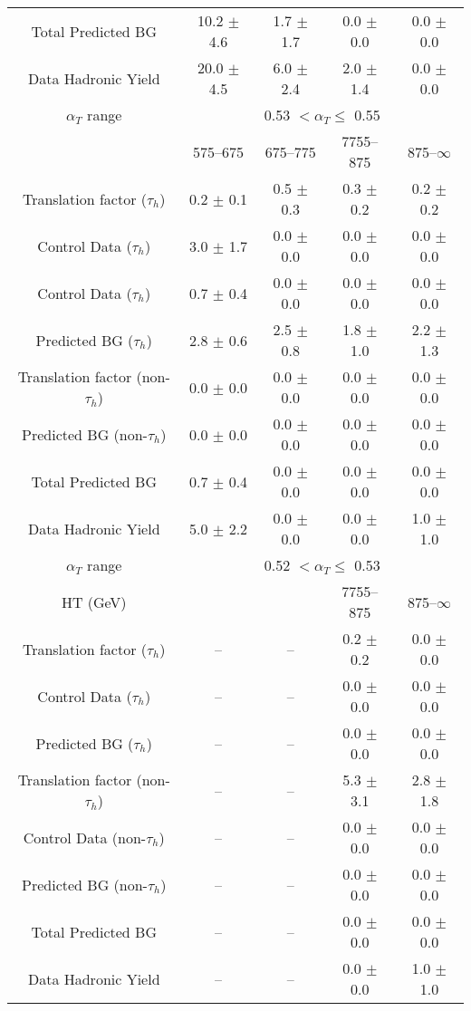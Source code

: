 \documentclass[a4paper,12pt]{article}
\begin{document}
\begin{table}[htl]
\begin{flushleft}
\begin{tabular}{ c|cccc }
Total Predicted BG & 10.2 $\pm$ 4.6  & 1.7 $\pm$ 1.7  & 0.0 $\pm$ 0.0  & 0.0 $\pm$ 0.0 \\ 
Data Hadronic Yield & 20.0 $\pm$ 4.5  & 6.0 $\pm$ 2.4  & 2.0 $\pm$ 1.4  & 0.0 $\pm$ 0.0 \\ 
\hline
\hline
 $ \alpha_T $ range  &  \multicolumn{4}{c}{0.53 $ < \alpha_T \leq $ 0.55}\\ 
  & 575--675 & 675--775 & 7755--875 & 875--$\infty$ \\ 
 Translation factor ($\tau_h$) & 0.2 $\pm$ 0.1  & 0.5 $\pm$ 0.3  & 0.3 $\pm$ 0.2  & 0.2 $\pm$ 0.2 \\ 
Control Data ($\tau_h$) & 3.0 $\pm$ 1.7  & 0.0 $\pm$ 0.0  & 0.0 $\pm$ 0.0  & 0.0 $\pm$ 0.0 \\ 
Control Data ($\tau_h$) & 0.7 $\pm$ 0.4  & 0.0 $\pm$ 0.0  & 0.0 $\pm$ 0.0  & 0.0 $\pm$ 0.0 \\ 
\hline
Predicted BG ($\tau_h$) & 2.8 $\pm$ 0.6  & 2.5 $\pm$ 0.8  & 1.8 $\pm$ 1.0  & 2.2 $\pm$ 1.3 \\ 
Translation factor (non-$\tau_h$) & 0.0 $\pm$ 0.0  & 0.0 $\pm$ 0.0  & 0.0 $\pm$ 0.0  & 0.0 $\pm$ 0.0 \\ 
Predicted BG (non-$\tau_h$) & 0.0 $\pm$ 0.0  & 0.0 $\pm$ 0.0  & 0.0 $\pm$ 0.0  & 0.0 $\pm$ 0.0 \\ 
\hline
Total Predicted BG & 0.7 $\pm$ 0.4  & 0.0 $\pm$ 0.0  & 0.0 $\pm$ 0.0  & 0.0 $\pm$ 0.0 \\ 
Data Hadronic Yield & 5.0 $\pm$ 2.2  & 0.0 $\pm$ 0.0  & 0.0 $\pm$ 0.0  & 1.0 $\pm$ 1.0 \\ 
\hline
\hline
 $ \alpha_T $ range &  \multicolumn{4}{c}{0.52 $ < \alpha_T \leq $ 0.53}\\ 
  HT (GeV) &  &  & 7755--875 & 875--$\infty$ \\ 
 Translation factor ($\tau_h$) & --  & --  & 0.2 $\pm$ 0.2  & 0.0 $\pm$ 0.0 \\ 
Control Data ($\tau_h$) & --  & --  & 0.0 $\pm$ 0.0  & 0.0 $\pm$ 0.0 \\ 
Predicted BG ($\tau_h$) & --  & --  & 0.0 $\pm$ 0.0  & 0.0 $\pm$ 0.0 \\ 
\hline
Translation factor (non-$\tau_h$) & --  & --  & 5.3 $\pm$ 3.1  & 2.8 $\pm$ 1.8 \\ 
Control Data (non-$\tau_h$) & --  & --  & 0.0 $\pm$ 0.0  & 0.0 $\pm$ 0.0 \\ 
Predicted BG (non-$\tau_h$) & --  & --  & 0.0 $\pm$ 0.0  & 0.0 $\pm$ 0.0 \\ 
\hline
Total Predicted BG & --  & --  & 0.0 $\pm$ 0.0  & 0.0 $\pm$ 0.0 \\ 
Data Hadronic Yield & --  & --  & 0.0 $\pm$ 0.0  & 1.0 $\pm$ 1.0 \\ 
\hline
 \end{tabular}
 \end{flushleft}
\label{tab:bg-esti-tauhad}
 \end{table}
\end{document}
